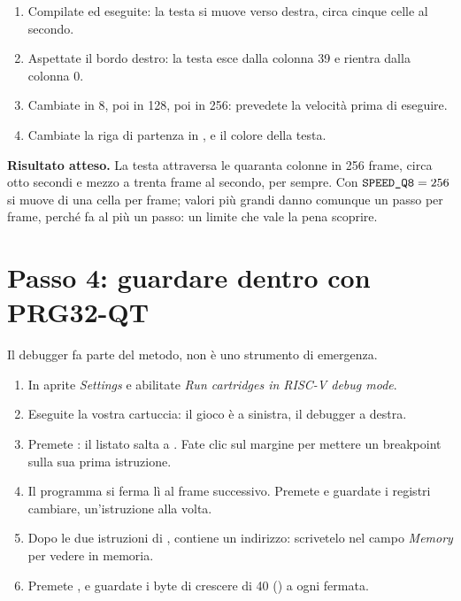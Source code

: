\begin{prgcheck}
\begin{enumerate}[nosep]
\item Compilate ed eseguite: la testa si muove verso destra, circa cinque celle al secondo.
\item Aspettate il bordo destro: la testa esce dalla colonna 39 e rientra dalla
  colonna 0.
\item Cambiate  in 8, poi in 128, poi in 256: prevedete la
  velocità prima di eseguire.
\item Cambiate la riga di partenza in , e il colore della testa.
\end{enumerate}
\textbf{Risultato atteso.} La testa attraversa le quaranta colonne in 256
frame, circa otto secondi e mezzo a trenta frame al secondo, per sempre. Con
$\texttt{SPEED\_Q8}=256$ si muove di una cella per frame; valori più grandi danno
comunque un passo per frame, perché  fa al più un passo: un limite
che vale la pena scoprire.
\end{prgcheck}

\section{Passo 4: guardare dentro con PRG32-QT}

Il debugger fa parte del metodo, non è uno strumento di emergenza.

\begin{prgtry}
\begin{enumerate}[nosep]
\item In \prgqt aprite \emph{Settings} e abilitate \emph{Run cartridges in
  RISC-V debug mode}.
\item Eseguite la vostra cartuccia: il gioco è a sinistra, il debugger a destra.
\item Premete : il listato salta a . Fate clic
  sul margine per mettere un breakpoint sulla sua prima istruzione.
\item Il programma si ferma lì al frame successivo. Premete  e
  guardate i registri cambiare, un'istruzione alla volta.
\item Dopo le due istruzioni di ,  contiene un indirizzo:
  scrivetelo nel campo \emph{Memory} per vedere  in memoria.
\item Premete , e guardate i byte di  crescere di 40
  () a ogni fermata.
\end{enumerate}
\end{prgtry}

